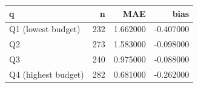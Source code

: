 \begin{tabular}{lrrr}
\toprule
q & n & MAE & bias \\
\midrule
Q1 (lowest budget) & 232 & 1.662000 & -0.407000 \\
Q2 & 273 & 1.583000 & -0.098000 \\
Q3 & 240 & 0.975000 & -0.088000 \\
Q4 (highest budget) & 282 & 0.681000 & -0.262000 \\
\bottomrule
\end{tabular}

